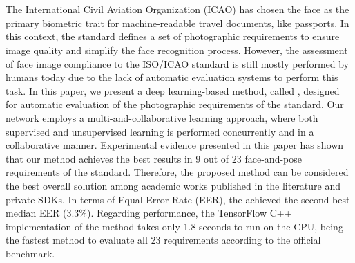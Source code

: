 \section*{}

The International Civil Aviation Organization (ICAO) has chosen the face as the primary biometric trait for machine-readable travel documents, like passports. In this context, the \icao standard defines a set of photographic requirements to ensure image quality and simplify the face recognition process. However, the assessment of face image compliance to the ISO/ICAO standard is still mostly performed by humans today due to the lack of automatic evaluation systems to perform this task. In this paper, we present a deep learning-based method, called \methodname, designed for automatic evaluation of the photographic requirements of the \icao standard. Our network employs a multi-and-collaborative learning approach, where both supervised and unsupervised learning is performed concurrently and in a collaborative manner. Experimental evidence presented in this paper has shown that our method achieves the best results in 9 out of 23 face-and-pose requirements of the \icao standard. Therefore, the proposed method can be considered the best overall solution among academic works published in the literature and private SDKs. In terms of Equal Error Rate (EER), the \methodname achieved the second-best median EER (3.3\%). Regarding performance, the TensorFlow C++ implementation of the method takes only 1.8 seconds to run on the CPU, being the fastest method to evaluate all 23 requirements according to the official benchmark.


\newpage